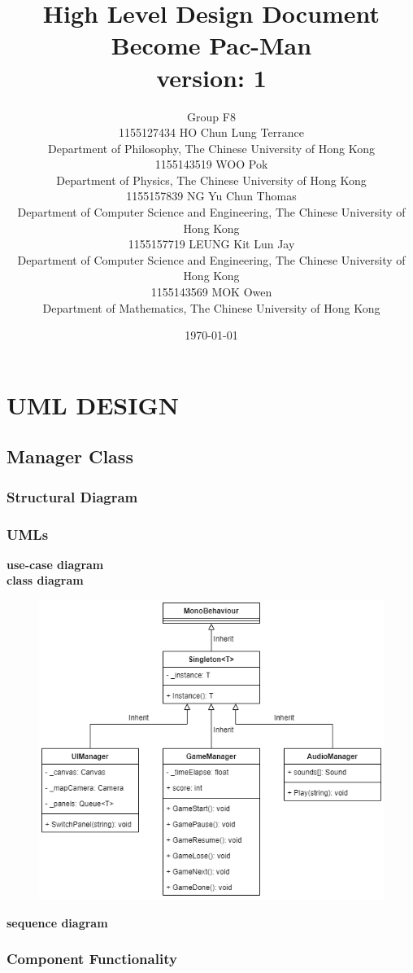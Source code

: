 \documentclass[11pt]{article}
\title{High Level Design Document\\Become Pac-Man\\version: 1}
\author{Group F8\\1155127434 HO Chun Lung Terrance\\
Department of Philosophy, The Chinese University of Hong Kong\\1155143519 WOO Pok\\
Department of Physics, The Chinese University of Hong Kong\\1155157839 NG Yu Chun Thomas\\
Department of Computer Science and Engineering, The Chinese University of Hong Kong\\1155157719 LEUNG Kit Lun Jay\\
Department of Computer Science and Engineering, The Chinese University of Hong Kong\\1155143569 MOK Owen\\
Department of Mathematics, The Chinese University of Hong Kong}
\date{\today}
\begin{document}
\maketitle
\tableofcontents
\newpage
\section{UML DESIGN}

\subsection{Manager Class}
\subsubsection{Structural Diagram}
\subsubsection{UMLs}
\textbf{use-case diagram}\\
\textbf{class diagram}\\
\begin{figure}[H]
    \centering
    \includegraphics*[scale=0.4]{UML-Class-Singleton.png}
\end{figure}
\textbf{sequence diagram}\\
\subsubsection{Component Functionality}
\end{document}
